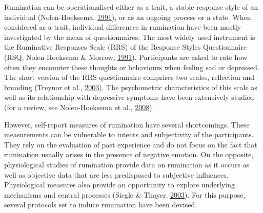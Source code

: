 \documentclass[a4paper,12pt,twoside,openright,oldfontcommands]{memoir}
\begin{document}
Rumination can be operationalised either as a trait, a stable response style of an individual (Nolen-Hoeksema, \protect\hyperlink{ref-nolen-hoeksema_responses_1991}{1991}), or as an ongoing process or a state. When considered as a trait, individual differences in rumination have been mostly investigated by the mean of questionnaires. The most widely used instrument is the Ruminative Responses Scale (RRS) of the Response Styles Questionnaire (RSQ, Nolen-Hoeksema \& Morrow, \protect\hyperlink{ref-nolen-hoeksema_prospective_1991}{1991}). Participants are asked to rate how often they encounter these thoughts or behaviours when feeling sad or depressed. The short version of the RRS questionnaire comprises two scales, reflection and brooding (Treynor et al., \protect\hyperlink{ref-treynor_rumination_2003}{2003}). The psychometric characteristics of this scale as well as its relationship with depressive symptoms have been extensively studied (for a review, see Nolen-Hoeksema et al., \protect\hyperlink{ref-Nolen-Hoeksema2008}{2008}).

However, self-report measures of rumination have several shortcomings. These measurements can be vulnerable to intents and subjectivity of the participants. They rely on the evaluation of past experience and do not focus on the fact that rumination usually arises in the presence of negative emotion. On the opposite, physiological studies of rumination provide data on rumination as it occurs as well as objective data that are less predisposed to subjective influences. Physiological measures also provide an opportunity to explore underlying mechanisms and central processes (Siegle \& Thayer, \protect\hyperlink{ref-papageorgiou_physiological_2003}{2003}). For this purpose, several protocols set to induce rumination have been devised.
\end{document}
